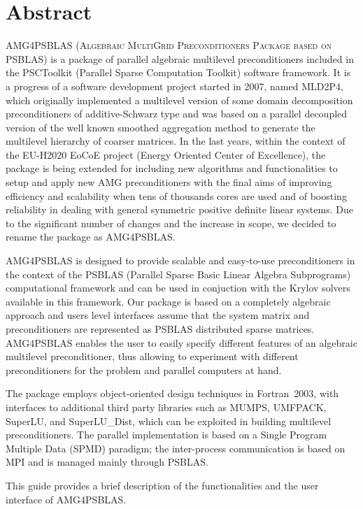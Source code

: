 \section*{Abstract}

\textsc{AMG4PSBLAS (Algebraic MultiGrid Preconditioners Package
based on PSBLAS}) is a package of parallel algebraic multilevel preconditioners included in the PSCToolkit (Parallel Sparse Computation Toolkit) software framework.
It is a progress of a software development project started in 2007, named MLD2P4, which originally implemented a 
multilevel version of some domain decomposition preconditioners of additive-Schwarz type and was based on a parallel decoupled version of the well known smoothed
aggregation method to generate the multilevel hierarchy of coarser matrices. 
In the last years, within the context of the EU-H2020 EoCoE project (Energy Oriented Center of Excellence), the package is being extended for including new algorithms and 
functionalities to setup and apply new AMG preconditioners with the final aims of improving efficiency and scalability when tens of thousands cores are
used and of boosting reliability in dealing with general symmetric positive definite linear systems. 
Due to the significant number of changes and the increase in scope, we decided to rename the package as AMG4PSBLAS.

AMG4PSBLAS is designed to provide scalable and easy-to-use preconditioners
in the context of the PSBLAS (Parallel Sparse Basic Linear Algebra Subprograms)
computational framework and can be used in conjuction with the Krylov solvers
available in this framework.
Our package is based on a completely algebraic approach and users level interfaces
assume that the system matrix and preconditioners are represented as PSBLAS
distributed sparse matrices.
AMG4PSBLAS enables the user to easily specify different
features of an algebraic multilevel preconditioner, thus allowing to experiment
with different preconditioners for the problem and parallel computers at hand.

The package employs object-oriented design techniques in
Fortran~2003, with interfaces to additional third party libraries
such as MUMPS, UMFPACK, SuperLU, and SuperLU\_Dist, which
can be exploited in building multilevel preconditioners. The parallel
implementation is based on a Single Program Multiple Data (SPMD)
paradigm; the inter-process communication is based on MPI and
is managed mainly through PSBLAS.

This guide provides a brief description of the functionalities and
the user interface of AMG4PSBLAS. 
